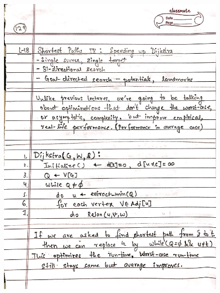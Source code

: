 \newpage
\begin{figure}[H]
    \centering
    \includegraphics[scale=0.25]{"./MIT-6.006/MIT-6006-129"}
\end{figure}
\newpage
